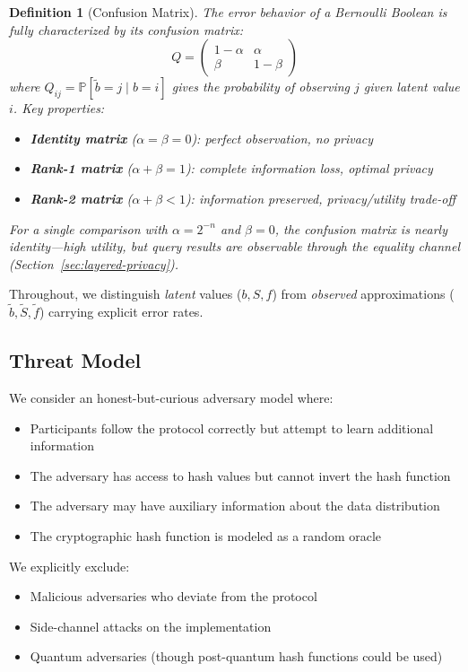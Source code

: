 \documentclass[10pt,conference]{IEEEtran}
\newtheorem{definition}[theorem]{Definition}
\newcommand{\fpr}{\alpha}                   %
\newcommand{\fnr}{\beta}                    %
\newcommand{\obs}[1]{\tilde{#1}}            %
\newcommand{\ConfMat}{Q}                    %
\begin{document}
\begin{definition}[Confusion Matrix]
\label{def:confusion-matrix}
The error behavior of a Bernoulli Boolean is fully characterized by its \emph{confusion matrix}:
$$\ConfMat = \begin{pmatrix} 1-\fpr & \fpr \\ \fnr & 1-\fnr \end{pmatrix}$$
where $\ConfMat_{ij} = \mathbb{P}[\obs{b} = j \mid b = i]$ gives the probability of observing $j$ given latent value $i$. Key properties:
\begin{itemize}
\item \textbf{Identity matrix} ($\fpr = \fnr = 0$): perfect observation, no privacy
\item \textbf{Rank-1 matrix} ($\fpr + \fnr = 1$): complete information loss, optimal privacy
\item \textbf{Rank-2 matrix} ($\fpr + \fnr < 1$): information preserved, privacy/utility trade-off
\end{itemize}
For a single comparison with $\fpr = 2^{-n}$ and $\fnr = 0$, the confusion matrix is nearly identity---high utility, but query results are observable through the equality channel (Section~\ref{sec:layered-privacy}).
\end{definition}

Throughout, we distinguish \emph{latent} values ($b, S, f$) from \emph{observed} approximations ($\obs{b}, \obs{S}, \obs{f}$) carrying explicit error rates.

\subsection{Threat Model}

We consider an honest-but-curious adversary model where:
\begin{itemize}
\item Participants follow the protocol correctly but attempt to learn additional information
\item The adversary has access to hash values but cannot invert the hash function
\item The adversary may have auxiliary information about the data distribution
\item The cryptographic hash function is modeled as a random oracle
\end{itemize}

We explicitly exclude:
\begin{itemize}
\item Malicious adversaries who deviate from the protocol
\item Side-channel attacks on the implementation
\item Quantum adversaries (though post-quantum hash functions could be used)
\end{itemize}
\end{document}
